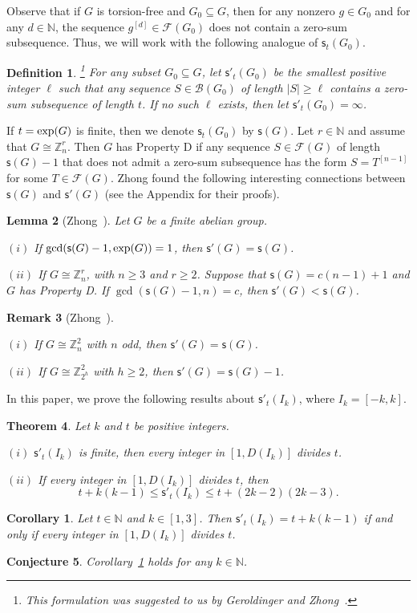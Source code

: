 \documentclass[12 pt]{amsart}
\newtheorem{theorem}{Theorem}
\newtheorem{corollary}{Corollary}
\newtheorem{lemma}[theorem]{Lemma}
\newtheorem{conj}[theorem]{Conjecture}
\newtheorem{remark}[theorem]{Remark}
\newtheorem{defi}[theorem]{Definition}
\def \n{\noindent }
\def \F{\mathcal F}
\def \B{\mathcal B}
\def \Z{\mathbb Z}
\def \N{\mathbb N}
\def \Z{\mathbb Z}
\def \m{\mathsf{s}'}
\def \ls{\mathsf{s}}
\begin{document}
Observe that if $G$ is torsion-free and $G_0\subseteq G$,
then for any nonzero $g\in G_0$ and for any $d\in\N$, the sequence $g^{[d]}\in\F(G_0)$ does not contain a zero-sum subsequence. Thus, we will work with the following analogue 
of $\ls_t(G_0)$.
\begin{defi}\footnote{This formulation was suggested to us by Geroldinger and Zhong~\cite{GZ}.}
For any subset $G_0\subseteq G$, let $\m_t(G_0)$ be the smallest positive integer $\ell$ such that any sequence $S\in\B(G_0)$ of length $|S|\ge \ell$ contains a zero-sum subsequence of length $t$.
If no such $\ell$ exists, then let $\m_t(G_0)=\infty$.
\end{defi}
%
If $t={\rm exp}(G)$ is finite, then we denote $\ls_t(G_0)$ by $\ls(G)$. Let $r\in\N$ and assume that  $G\cong \Z_n^r$. Then $G$ has {\rm Property D} if any sequence $S\in\F(G)$ of length $\ls(G)-1$ that does not 
admit a zero-sum subsequence  has the form $S=T^{[n-1]}$ 
for some $T\in\F(G)$. Zhong found the following interesting connections between  $\ls(G)$ and $\m(G)$ (see the Appendix 
for their proofs). 
%
\begin{lemma}[Zhong~\cite{Z}]\label{lem:QZ} Let $G$ be a finite abelian group.
	
	\n $(i)$  If $\gcd(\ls(G)-1,{\rm exp}(G))=1$,
	then $\m(G)=\ls(G)$. 
	
	\n $(ii)$ If $G\cong \Z_n^r$, with $n\geq 3$ and $r\geq2$.
	Suppose that $\ls(G)=c(n-1)+1$ and $G$ has Property D.
	If $\gcd(\ls(G)-1,n)=c$, then $\m(G)<\ls(G)$.
\end{lemma}
%
\begin{remark}[Zhong~\cite{Z}]\label{rmk:QZ}\
	
	\n $(i)$ If $G\cong \Z^2_n$ with $n$ odd, then $\m(G)=\ls(G)$.
	
	\n $(ii)$ If $G\cong \Z^2_{2^h}$ with $h\geq 2$, then $\m(G)=\ls(G)-1$.
\end{remark}
%

 In this paper, we prove the following results about $\m_t(I_k)$, where $I_k=[-k,k]$.
\begin{theorem}\label{thm:1} Let $k$ and $t$ be  positive integers.

\n $(i)$ $\m_t(I_k)$ is finite, then every integer in $[1,D(I_k)]$ divides $t$.

\n $(ii)$ If every integer in $[1,D(I_k)]$ divides $t$, then 
\[t+k(k-1)\leq  \m_t(I_k)\leq t+(2k-2)(2k-3).\]   
\end{theorem}
%
\begin{corollary}\label{cor:1} Let $t\in\N$ and $k\in[1,3]$. Then $\m_t(I_k)= t+k(k-1)$ if and only if  every integer in $[1,D(I_k)]$ divides $t$. 
\end{corollary}
%
\begin{conj}\label{conj:1} Corollary~\ref{cor:1} 
holds for any $k\in\N$.   
\end{conj}
\end{document}
